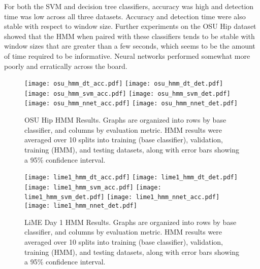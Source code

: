 For both the SVM and decision tree classifiers, accuracy was high and
detection time was low across all three datasets. Accuracy and detection
time were also stable with respect to window size. Further experiments on the
OSU Hip dataset showed that the HMM when paired with these classifiers
tends to be stable with window sizes that are greater than a few seconds,
which seems to be the amount of time required to be informative. Neural networks
performed somewhat more poorly and erratically across the board.

\begin{figure}[H]
 \centering
 \texttt{[image: osu\_hmm\_dt\_acc.pdf]} \hspace{1em}\vspace{1em}
 \texttt{[image: osu\_hmm\_dt\_det.pdf]}
 \texttt{[image: osu\_hmm\_svm\_acc.pdf]} \hspace{1em}\vspace{1em}
 \texttt{[image: osu\_hmm\_svm\_det.pdf]}
 \texttt{[image: osu\_hmm\_nnet\_acc.pdf]} \hspace{1em}
 \texttt{[image: osu\_hmm\_nnet\_det.pdf]}
 \caption{OSU Hip HMM Results.
  Graphs are organized into rows by base classifier, and columns by evaluation
  metric. HMM results were averaged over 10 splits into training
  (base classifier), validation, training (HMM), and testing datasets, along with 
  error bars showing a 95\% confidence interval.}
 \label{fig:osu_hmm}
\end{figure}

\begin{figure}[H]
 \centering
 \texttt{[image: lime1\_hmm\_dt\_acc.pdf]} \hspace{1em}\vspace{1em}
 \texttt{[image: lime1\_hmm\_dt\_det.pdf]} 
 \texttt{[image: lime1\_hmm\_svm\_acc.pdf]} \hspace{1em}\vspace{1em}
 \texttt{[image: lime1\_hmm\_svm\_det.pdf]} 
 \texttt{[image: lime1\_hmm\_nnet\_acc.pdf]} \hspace{1em}
 \texttt{[image: lime1\_hmm\_nnet\_det.pdf]} 
 \caption{LiME Day 1 HMM Results.
  Graphs are organized into rows by base classifier, and columns by evaluation
  metric. HMM results were averaged over 10 splits into training
  (base classifier), validation, training (HMM), and testing datasets, along with 
  error bars showing a 95\% confidence interval.}
 \label{fig:lime1_hmm}
\end{figure}

